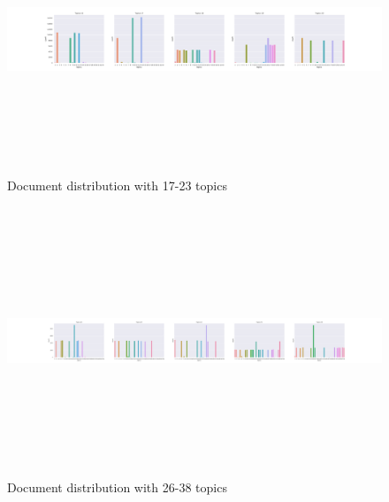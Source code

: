 \begin{figure}[h]
    \centering
    \includegraphics[width=15cm, height=8cm]{figures/doc_distr/doc_distribution_17-23.png}
    \caption{Document distribution with 17-23 topics}
    \label{fig:Doc_distr_17-21corpus}
\end{figure}

\begin{figure}[h]
    \centering
    \includegraphics[width=15cm, height=8cm]{figures/doc_distr/doc_distribution_26-38.png}
    \caption{Document distribution with 26-38 topics}
    \label{fig:Doc_distr_26-38corpus}
\end{figure}

\FloatBarrier

